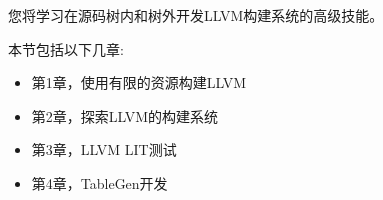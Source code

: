 您将学习在源码树内和树外开发LLVM构建系统的高级技能。

本节包括以下几章:\par

\begin{itemize}
	\item 第1章，使用有限的资源构建LLVM
	\item 第2章，探索LLVM的构建系统
	\item 第3章，LLVM LIT测试
	\item 第4章，TableGen开发
\end{itemize}

\newpage
